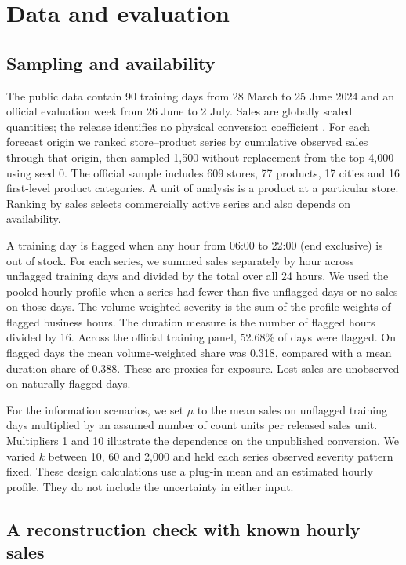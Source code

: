 \documentclass[11pt,a4paper]{article}
\begin{document}
\section{Data and evaluation}

\subsection{Sampling and availability}

The public data contain 90 training days from 28 March to 25 June 2024 and an official evaluation week from 26 June to 2 July. Sales are globally scaled quantities; the release identifies no physical conversion coefficient \cite{ref2,ref7}. For each forecast origin we ranked store--product series by cumulative observed sales through that origin, then sampled 1,500 without replacement from the top 4,000 using seed 0. The official sample includes 609 stores, 77 products, 17 cities and 16 first-level product categories. A unit of analysis is a product at a particular store. Ranking by sales selects commercially active series and also depends on availability.

A training day is flagged when any hour from 06:00 to 22:00 (end exclusive) is out of stock. For each series, we summed sales separately by hour across unflagged training days and divided by the total over all 24 hours. We used the pooled hourly profile when a series had fewer than five unflagged days or no sales on those days. The volume-weighted severity is the sum of the profile weights of flagged business hours. The duration measure is the number of flagged hours divided by 16. Across the official training panel, 52.68\% of days were flagged. On flagged days the mean volume-weighted share was 0.318, compared with a mean duration share of 0.388. These are proxies for exposure. Lost sales are unobserved on naturally flagged days.

For the information scenarios, we set \(\mu\) to the mean sales on unflagged training days multiplied by an assumed number of count units per released sales unit. Multipliers 1 and 10 illustrate the dependence on the unpublished conversion. We varied \(k\) between 10, 60 and 2,000 and held each series\textquotesingle{} observed severity pattern fixed. These design calculations use a plug-in mean and an estimated hourly profile. They do not include the uncertainty in either input.

\subsection{A reconstruction check with known hourly sales}
\end{document}
